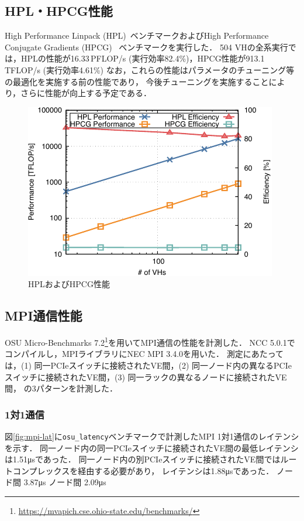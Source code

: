 ﻿\documentclass[submit,techrep,noauthor]{ipsj}
\newcommand{\us}{\si{\micro\second}}
\begin{document}
\subsection{HPL・HPCG性能}

High Performance Linpack (HPL)~\cite{Dongarra2003}ベンチマークおよびHigh Performance Conjugate
Gradients (HPCG)~\cite{Dongarra2016} ベンチマークを実行した．
504 VHの全系実行では，HPLの性能が16.33\,PFLOP/s (実行効率82.4\%)，HPCG性能が913.1\,TFLOP/s 
(実行効率4.61\%) なお，これらの性能はパラメータのチューニング等の最適化を実施する前の性能であり，
今後チューニングを実施することにより，さらに性能が向上する予定である．

\begin{figure}
  \centering
  \includegraphics{figs/hpl_hpcg.pdf}
  \caption{HPLおよびHPCG性能}\label{fig:hpl-hpcg}
\end{figure}

\subsection{MPI通信性能}

OSU Micro-Benchmarks
7.2\footnote{\url{https://mvapich.cse.ohio-state.edu/benchmarks/}}を用いてMPI通信の性能を計測した．
NCC 5.0.1でコンパイルし，MPIライブラリにNEC MPI 3.4.0を用いた．
測定にあたっては，(1) 同一PCIeスイッチに接続されたVE間，(2)
同一ノード内の異なるPCIeスイッチに接続されたVE間，(3) 同一ラックの異なるノードに接続されたVE間，
の3パターンを計測した．

\subsubsection{1対1通信}

図\ref{fig:mpi-lat}に\verb|osu_latency|ベンチマークで計測したMPI 1対1通信のレイテンシを示す．
同一ノード内の同一PCIeスイッチに接続されたVE間の最低レイテンシは1.51\us であった．
同一ノード内の別PCIeスイッチに接続されたVE間ではルートコンプレックスを経由する必要があり，
レイテンシは1.88\us であった．
ノード間 3.87\us
ノード間 2.09\us
\end{document}
